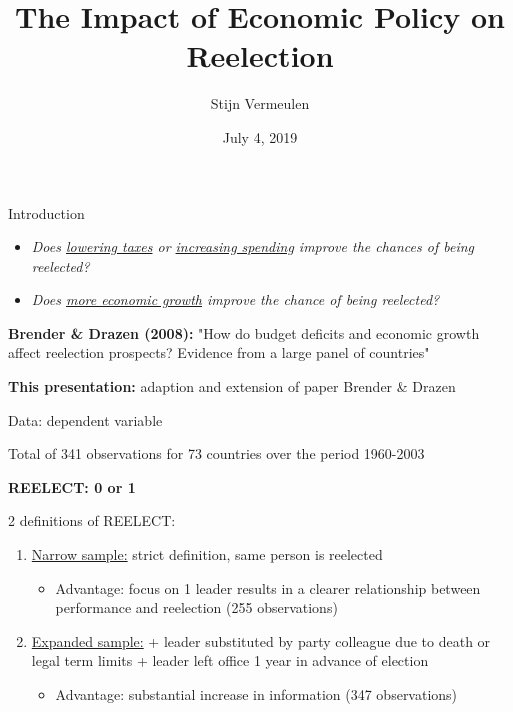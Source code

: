 \documentclass{beamer}
\title[Economic Policy \& Reelection]{The Impact of Economic Policy on Reelection}
\author[Vermeulen]{Stijn Vermeulen}
\date[July 4, 2019]{July 4, 2019}
\begin{document}
\begin{frame}
\titlepage
\end{frame}
\begin{frame}{Introduction}
    \setlength\itemsep{1.5em}
    \begin{itemize}
    \setlength\itemsep{1.5em}
        \item  \textit{Does \underline{lowering taxes} or \underline{increasing spending} improve the chances of being reelected?}\pause
        \item  \textit{Does \underline{more economic growth} improve the chance of being reelected?} \pause
    \end{itemize}
    
    \item \textbf{Brender \& Drazen (2008):} "How do budget deficits and economic growth affect reelection prospects? Evidence from a large panel of countries"
    
    \item \textbf{This presentation:} adaption and extension of paper Brender \& Drazen
    
\end{frame}
\begin{frame}{Data: dependent variable}
    \setlength\itemsep{1.5em}
     \item Total of 341 observations for 73 countries over the period 1960-2003
    \item \textbf{REELECT: 0 or 1}
\item 2 definitions of REELECT:
 \begin{enumerate}
    \item \underline{Narrow sample:} strict definition, same person is reelected
 \begin{itemize}
 \item Advantage: focus on 1 leader results in a clearer relationship between performance and reelection (255 observations)
 \end{itemize}

    \item \underline{Expanded sample:} + leader substituted by party colleague due to death or legal term limits + leader left office 1 year in advance of election
 \begin{itemize}
 \item Advantage: substantial increase in information (347 observations)
 \end{itemize}
\end{enumerate}

\end{frame}
\end{document}
